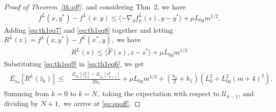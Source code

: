 \documentclass{article}
\theoremstyle{plain}
\theoremstyle{definition}
\theoremstyle{remark}
\begin{document}
\begin{proof}[Proof of Theorem~\ref{th:off}]
    and considering \cite{nesterov_random_2017} Thm~2, we have 
    \begin{align}\label{eq:th1eq8}
         f^L(x,y^\ast)-f^L(x,y)\leq \langle -\nabla_yf^L_{\mu}(z),y-y^\ast\rangle+\mu L_{0y}m^{1/2}.
    \end{align}
    Adding \eqref{eq:th1eq7} and \eqref{eq:th1eq8} together and letting $R^L(z) = f^L(x,y^\ast)-f^L(x^\ast,y),$ we have
    \begin{align}\label{eq:th1eq9}
        R^L(z) \leq\langle \hat{F}(z),z-z^\ast\rangle+\mu L_{0y}m^{1/2}
    \end{align}
    Substituting \eqref{eq:th1eq9} in \eqref{eq:th1eq6}, we get
    \begin{align}
    \begin{split}
        E_{u_k}[R^L(\hat{z}_k)]\leq& \frac{E_{u_k}[r_k^2]-E_{\hat{u}_k}[r_{k+1}^2]}{2h_2}+\mu L_{0y}m^{1/2} +(\tfrac{h_2}{2}+h_1)( L_0^2 + L_{0y}^2(m+4)^2).
    \end{split}\label{eq:th1eq10}
    \end{align}
    Summing from $k=0$ to $k=N,$ taking the expectation with respect to $\mathcal{U}_{k-1}$,  and dividing by $N+1,$ we arrive at \eqref{eq:eqoff}. 
    

\end{proof}
\end{document}
